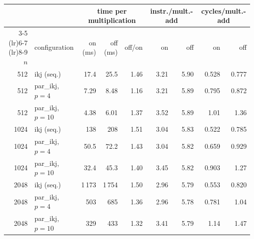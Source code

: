 \begin{tabular}{rlrrrrrrr}
\toprule
 & & \multicolumn{3}{c}{time per multiplication} & \multicolumn{2}{c}{instr./mult.-add} & \multicolumn{2}{c}{cycles/mult.-add} \\ \cmidrule(lr){3-5} \cmidrule(lr){6-7} \cmidrule(lr){8-9} $n$ & configuration & on (ms) & off (ms) & off/on & on & off & on & off \\
\midrule
512 & ikj (seq.) & 17.4 & 25.5 & 1.46 & 3.21 & 5.90 & 0.528 & 0.777 \\
512 & par\_ikj, $p=4$ & 7.29 & 8.48 & 1.16 & 3.21 & 5.89 & 0.795 & 0.872 \\
512 & par\_ikj, $p=10$ & 4.38 & 6.01 & 1.37 & 3.52 & 5.89 & 1.01 & 1.36 \\
1024 & ikj (seq.) & 138 & 208 & 1.51 & 3.04 & 5.83 & 0.522 & 0.785 \\
1024 & par\_ikj, $p=4$ & 50.5 & 72.2 & 1.43 & 3.04 & 5.82 & 0.659 & 0.929 \\
1024 & par\_ikj, $p=10$ & 32.4 & 45.3 & 1.40 & 3.45 & 5.82 & 0.903 & 1.27 \\
2048 & ikj (seq.) & 1\,173 & 1\,754 & 1.50 & 2.96 & 5.79 & 0.553 & 0.820 \\
2048 & par\_ikj, $p=4$ & 503 & 685 & 1.36 & 2.96 & 5.78 & 0.781 & 1.04 \\
2048 & par\_ikj, $p=10$ & 329 & 433 & 1.32 & 3.41 & 5.79 & 1.14 & 1.47 \\
\bottomrule
\end{tabular}
